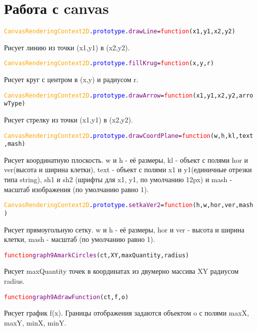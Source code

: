 \documentclass[a4paper,12pt]{article}
\begin{document}
	\section{Работа с canvas}
		\begin{alltt}
			\textcolor{Orange}{CanvasRenderingContext2D}.\textcolor{Blue}{prototype}.\textcolor{Purple}{drawLine}=\textcolor{Red}{function}(x1,y1,x2,y2)
		\end{alltt}
	Рисует линию из точки (x1,y1) в (x2,y2).
		\begin{alltt}
			\textcolor{Orange}{CanvasRenderingContext2D}.\textcolor{Blue}{prototype}.\textcolor{Purple}{fillKrug}=\textcolor{Red}{function}(x,y,r)
		\end{alltt}
	Рисует круг с центром в (x,y) и радиусом r. 
		\begin{alltt}
			\textcolor{Orange}{CanvasRenderingContext2D}.\textcolor{Blue}{prototype}.\textcolor{Purple}{drawArrow}=\textcolor{Red}{function}(x1, y1, x2, y2, arrowType)
		\end{alltt}%
	Рисует стрелку из точки (x1,y1) в (x2,y2).
		\begin{alltt}
			\textcolor{Orange}{CanvasRenderingContext2D}.\textcolor{Blue}{prototype}.\textcolor{Purple}{drawCoordPlane }=\textcolor{Red}{function}(w, h, kl, text, mash)
		\end{alltt}
	Рисует координатную плоскость. w и h  \-- её размеры, kl \-- объект с полями hor и ver(высота и ширина клетки), text \-- объект с полями x1 и y1(единичные отрезки типа string), sh1 и sh2 (шрифты для x1, y1, по умолчанию 12px) и mash - масштаб изображения (по умолчанию равно 1).
		\begin{alltt}
			\textcolor{Orange}{CanvasRenderingContext2D}.\textcolor{Blue}{prototype}.\textcolor{Purple}{setkaVer2  }=\textcolor{Red}{function}(h, w, hor, ver, mash)
		\end{alltt}
	Рисует прямоугольную сетку. w и h  \-- её размеры, hor и ver \-- высота и ширина клетки, mash - масштаб (по умолчанию равно 1).
		\begin{alltt} 
			\textcolor{Red}{function} \textcolor{Purple}{graph9AmarkCircles}(ct, XY, maxQuantity, radius)
		\end{alltt}	
	Рисует maxQuantity точек в координатах из двумерно массива XY радиусом radius.
		\begin{alltt}
			\textcolor{Red}{function} \textcolor{Purple}{graph9AdrawFunction}(ct, f, o)
		\end{alltt}	
	Рисует график f(x). Границы отображения задаются объектом o с полями maxX, maxY, minX, minY.
\end{document}

